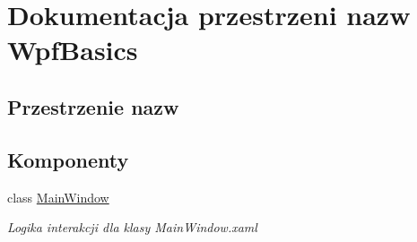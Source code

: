 \hypertarget{namespace_wpf_basics}{}\section{Dokumentacja przestrzeni nazw Wpf\+Basics}
\label{namespace_wpf_basics}
\subsection*{Przestrzenie nazw}
\begin{DoxyCompactItemize}
\end{DoxyCompactItemize}
\subsection*{Komponenty}
\begin{DoxyCompactItemize}
\item 
class \hyperlink{class_wpf_basics_1_1_main_window}{Main\+Window}
\begin{DoxyCompactList}\small\item\em Logika interakcji dla klasy Main\+Window.\+xaml \end{DoxyCompactList}\end{DoxyCompactItemize}
